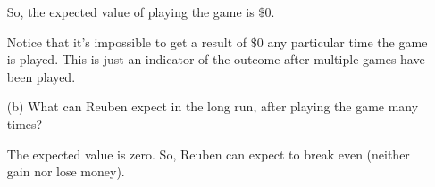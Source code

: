 \begin{mdframed}
\begin{itemize}
      So, the expected value of playing the game is $\$0$.

      Notice that it's impossible to get a result of $\$0$ any particular time
      the game is played. This is just an indicator of the outcome after
      multiple games have been played.

    \item[(b)] 	What can Reuben expect in the long run, after playing the game
      many times?

      The expected value is zero. So, Reuben can expect to break even (neither
      gain nor lose money).
  \end{itemize}
\end{mdframed}

\newpage
